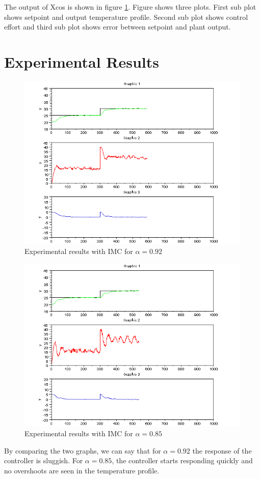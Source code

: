 The output of Xcos is shown in figure \ref{imc}.
Figure shows three plots. First sub plot shows setpoint and output temperature profile. 
Second sub plot shows control effort and third sub plot shows error between setpoint and plant output.



\section{Experimental Results}
\begin{figure}
	\centering
		\includegraphics[width=\linewidth]{IMC/imc_092_resp.png}
	\caption{Experimental results with IMC for $\alpha=0.92$}
	\label{imc}
\end{figure}
\begin{figure}
	\centering
		\includegraphics[width=\linewidth]{IMC/imc_085_resp.png}
		\caption{Experimental results with IMC for $\alpha=0.85$}
	\label{fig:0.98}
\end{figure}
By comparing the two graphs, we can say that for $\alpha=0.92$ the response of the controller is sluggish. For $\alpha=0.85$,
the controller starts responding quickly and no overshoots are seen in the temperature profile.


